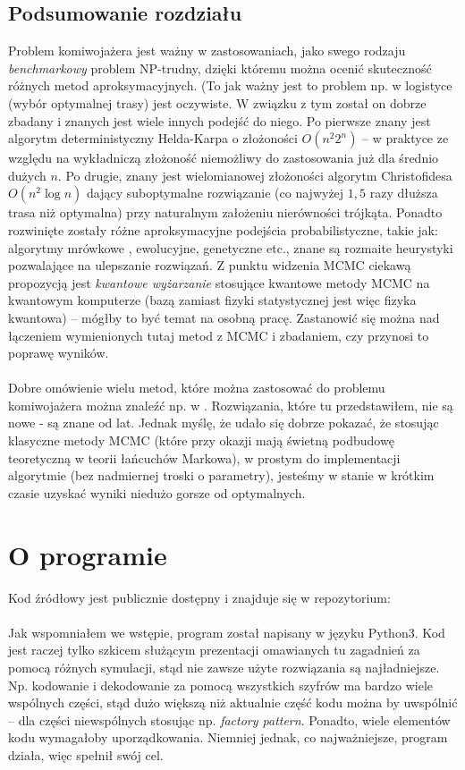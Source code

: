 \documentclass[a4paper]{article}
\theoremstyle{defn}
\theoremstyle{theorem}
\theoremstyle{lemma}
\theoremstyle{cor}
\theoremstyle{fact}
\begin{document}
\subsection{Podsumowanie rozdziału}
Problem komiwojażera jest ważny w zastosowaniach, jako swego rodzaju \textit{benchmarkowy} problem NP-trudny, dzięki któremu można ocenić skuteczność różnych metod aproksymacyjnych. (To jak ważny jest to problem np. w logistyce (wybór optymalnej trasy) jest oczywiste. W związku z tym został on dobrze zbadany i znanych jest wiele innych podejść do niego. Po pierwsze znany jest algorytm deterministyczny Helda-Karpa \cite{heldkarp} o złożoności $O(n^2 2^n)$ – w praktyce ze względu na wykładniczą złożoność niemożliwy do zastosowania już dla średnio dużych $n$. Po drugie, znany jest wielomianowej złożoności algorytm Christofidesa $O(n^2 \log n)$ \cite{christofides} dający suboptymalne rozwiązanie (co najwyżej $1,5$ razy dłuższa trasa niż optymalna) przy naturalnym założeniu nierówności trójkąta. Ponadto rozwinięte zostały różne aproksymacyjne podejścia probabilistyczne, takie jak: algorytmy mrówkowe \cite{mrowki}, ewolucyjne, genetyczne \cite{genetic} etc., znane są rozmaite heurystyki pozwalające na ulepszanie rozwiązań. Z punktu widzenia MCMC ciekawą propozycją jest \textit{kwantowe wyżarzanie} \cite{quantum} stosujące kwantowe metody MCMC na kwantowym komputerze (bazą zamiast fizyki statystycznej jest więc fizyka kwantowa) – mógłby to być temat na osobną pracę. Zastanowić się można nad łączeniem wymienionych tutaj metod z MCMC i zbadaniem, czy przynosi to poprawę wyników.\\\\
Dobre omówienie wielu metod, które można zastosować do problemu komiwojażera można znaleźć np. w \cite{tsprev}. Rozwiązania, które tu przedstawiłem, nie są nowe - są znane od lat. Jednak myślę, że udało się dobrze pokazać, że stosując klasyczne metody MCMC (które przy okazji mają świetną podbudowę teoretyczną w teorii łańcuchów Markowa), w prostym do implementacji algorytmie (bez nadmiernej troski o parametry), jesteśmy w stanie w krótkim czasie uzyskać wyniki niedużo gorsze od optymalnych.
\newpage
\section{O programie}
Kod źródłowy jest publicznie dostępny i znajduje się w repozytorium: \cite{repo}\\\\
Jak wspomniałem we wstępie, program został napisany w języku Python3.
Kod jest raczej tylko szkicem służącym prezentacji omawianych tu zagadnień za pomocą różnych symulacji, stąd nie zawsze użyte rozwiązania są najładniejsze. Np. kodowanie i dekodowanie za pomocą wszystkich szyfrów ma bardzo wiele wspólnych części, stąd dużo większą niż aktualnie część kodu można by uwspólnić – dla części niewspólnych stosując np. \textit{factory pattern}. Ponadto, wiele elementów kodu wymagałoby uporządkowania. Niemniej jednak, co najważniejsze, program działa, więc spełnił swój cel.
\end{document}
